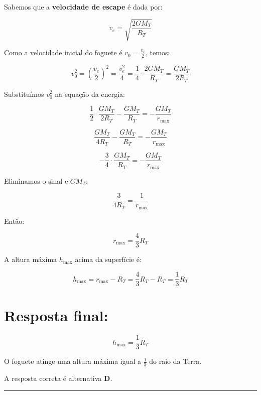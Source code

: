 \begin{flushleft}
Sabemos que a \textbf{velocidade de escape} é dada por:

\[
v_e = \sqrt{\frac{2 G M_T}{R_T}}
\]

Como a velocidade inicial do foguete é \(v_0 = \frac{v_e}{2}\), temos:

\[
v_0^2 = \left( \frac{v_e}{2} \right)^2 = \frac{v_e^2}{4} = \frac{1}{4} \cdot \frac{2 G M_T}{R_T} = \frac{G M_T}{2 R_T}
\]

Substituímos \(v_0^2\) na equação da energia:

\[
\frac{1}{2} \cdot \frac{G M_T}{2 R_T} - \frac{G M_T}{R_T} = - \frac{G M_T}{r_{\text{max}}}
\]

\[
\frac{G M_T}{4 R_T} - \frac{G M_T}{R_T} = - \frac{G M_T}{r_{\text{max}}}
\]

\[
-\frac{3}{4} \cdot \frac{G M_T}{R_T} = - \frac{G M_T}{r_{\text{max}}}
\]

Eliminamos o sinal e \(G M_T\):

\[
\frac{3}{4 R_T} = \frac{1}{r_{\text{max}}}
\]

Então:

\[
r_{\text{max}} = \frac{4}{3} R_T
\]

A altura máxima \(h_{\text{max}}\) acima da superfície é:

\[
h_{\text{max}} = r_{\text{max}} - R_T = \frac{4}{3} R_T - R_T = \frac{1}{3} R_T
\]

\section*{Resposta final:}

\[
\boxed{h_{\text{max}} = \frac{1}{3} R_T}
\]

O foguete atinge uma altura máxima igual a \(\frac{1}{3}\) do raio da Terra.


A resposta correta é alternativa \colorbox{green!50}{\textbf{D}}.
\end{flushleft}

\noindent\rule{\linewidth}{0.6pt}\\

